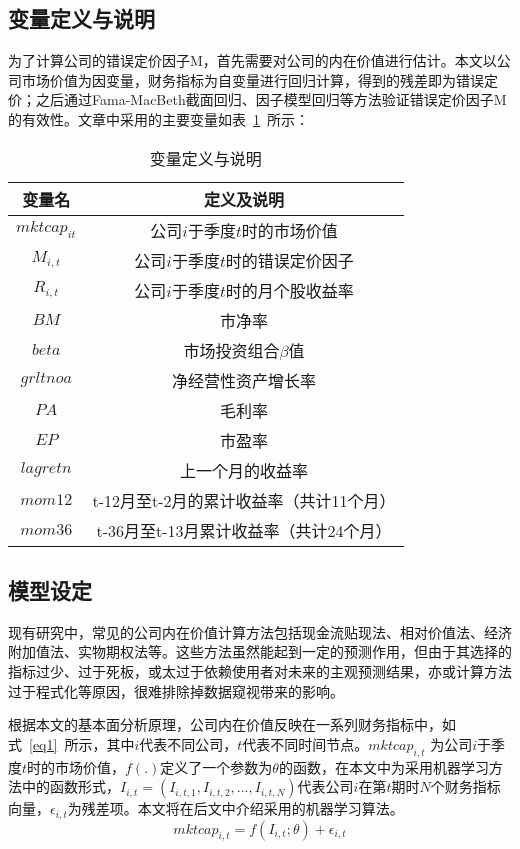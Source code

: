 \subsection{变量定义与说明}
为了计算公司的错误定价因子M，首先需要对公司的内在价值进行估计。本文以公司市场价值为因变量，财务指标为自变量进行回归计算，得到的残差即为错误定价；之后通过Fama-MacBeth截面回归、因子模型回归等方法验证错误定价因子M的有效性。文章中采用的主要变量如表~\ref{variable}~所示：
\begin{table}[htbp]
  \centering
  \caption{变量定义与说明}
  \label{variable}
  \begin{tabular*}{0.9\hsize}{@{\hskip\tabcolsep\extracolsep\fill}*{2}{c}}
    \toprule
    变量名 & 定义及说明   \\
    \midrule
   $ mktcap_{it} $  & 公司$i$于季度$t$时的市场价值  \\
   $M_{i, t}$  & 公司$i$于季度$t$时的错误定价因子  \\
    $R_{i, t}$  &公司$i$于季度$t$时的月个股收益率  \\
    $BM$ & 市净率\\
    $beta $  & 市场投资组合$\beta$值 \\
    $grltnoa$ & 净经营性资产增长率\\
    $PA  $   & 毛利率\\
    $EP$   & 市盈率 \\
    $lagretn$ &上一个月的收益率\\
    $mom12$ &t-12月至t-2月的累计收益率（共计11个月） \\
    $mom36$ & t-36月至t-13月累计收益率（共计24个月）\\
          \bottomrule
  \end{tabular*}
\end{table}

\subsection{模型设定}
现有研究中，常见的公司内在价值计算方法包括现金流贴现法、相对价值法、经济附加值法、实物期权法等。这些方法虽然能起到一定的预测作用，但由于其选择的指标过少、过于死板，或太过于依赖使用者对未来的主观预测结果，亦或计算方法过于程式化等原因，很难排除掉数据窥视带来的影响。

根据本文的基本面分析原理，公司内在价值反映在一系列财务指标中，如式~\ref{eq1}~所示，其中$i$代表不同公司，$t$代表不同时间节点。$mktcap_{i, t}$ 为公司$i$于季度$t$时的市场价值，$f(.)$定义了一个参数为$\theta$的函数，在本文中为采用机器学习方法中的函数形式，$ I_{i, t}=( I_{i, t,1},I_{i, t,2},...,I_{i, t,N})$代表公司$i$在第$t$期时$N$个财务指标向量，$\epsilon_{i, t}$为残差项。本文将在后文中介绍采用的机器学习算法。
\begin{equation}
\label{eq1}
mktcap_{i, t} =f(I_{i, t};\theta)+\epsilon_{i, t} 
\end{equation}

